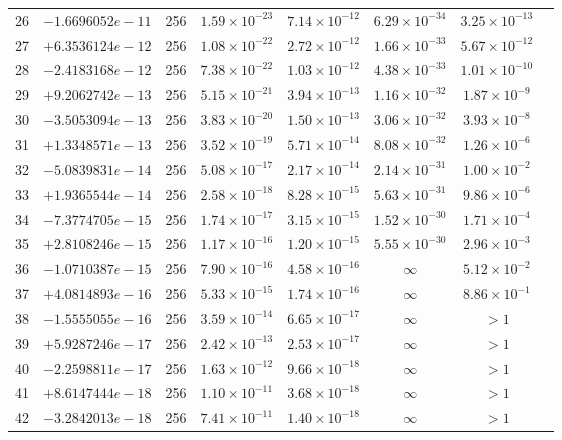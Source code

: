 \documentclass[11pt]{article}
\begin{document}
\begin{longtable}{rlcccccc}
26 & $-1.6696052e-11$ & 256 & $1.59 \times 10^{-23}$ & $7.14 \times 10^{-12}$ & $6.29 \times 10^{-34}$ & $3.25 \times 10^{-13}$ \\
27 & $+6.3536124e-12$ & 256 & $1.08 \times 10^{-22}$ & $2.72 \times 10^{-12}$ & $1.66 \times 10^{-33}$ & $5.67 \times 10^{-12}$ \\
28 & $-2.4183168e-12$ & 256 & $7.38 \times 10^{-22}$ & $1.03 \times 10^{-12}$ & $4.38 \times 10^{-33}$ & $1.01 \times 10^{-10}$ \\
29 & $+9.2062742e-13$ & 256 & $5.15 \times 10^{-21}$ & $3.94 \times 10^{-13}$ & $1.16 \times 10^{-32}$ & $1.87 \times 10^{-9}$ \\
30 & $-3.5053094e-13$ & 256 & $3.83 \times 10^{-20}$ & $1.50 \times 10^{-13}$ & $3.06 \times 10^{-32}$ & $3.93 \times 10^{-8}$ \\
31 & $+1.3348571e-13$ & 256 & $3.52 \times 10^{-19}$ & $5.71 \times 10^{-14}$ & $8.08 \times 10^{-32}$ & $1.26 \times 10^{-6}$ \\
32 & $-5.0839831e-14$ & 256 & $5.08 \times 10^{-17}$ & $2.17 \times 10^{-14}$ & $2.14 \times 10^{-31}$ & $1.00 \times 10^{-2}$ \\
33 & $+1.9365544e-14$ & 256 & $2.58 \times 10^{-18}$ & $8.28 \times 10^{-15}$ & $5.63 \times 10^{-31}$ & $9.86 \times 10^{-6}$ \\
34 & $-7.3774705e-15$ & 256 & $1.74 \times 10^{-17}$ & $3.15 \times 10^{-15}$ & $1.52 \times 10^{-30}$ & $1.71 \times 10^{-4}$ \\
35 & $+2.8108246e-15$ & 256 & $1.17 \times 10^{-16}$ & $1.20 \times 10^{-15}$ & $5.55 \times 10^{-30}$ & $2.96 \times 10^{-3}$ \\
\midrule
36 & $-1.0710387e-15$ & 256 & $7.90 \times 10^{-16}$ & $4.58 \times 10^{-16}$ & $\infty$ & $5.12 \times 10^{-2}$ \\
37 & $+4.0814893e-16$ & 256 & $5.33 \times 10^{-15}$ & $1.74 \times 10^{-16}$ & $\infty$ & $8.86 \times 10^{-1}$ \\
38 & $-1.5555055e-16$ & 256 & $3.59 \times 10^{-14}$ & $6.65 \times 10^{-17}$ & $\infty$ & $> 1$ \\
39 & $+5.9287246e-17$ & 256 & $2.42 \times 10^{-13}$ & $2.53 \times 10^{-17}$ & $\infty$ & $> 1$ \\
40 & $-2.2598811e-17$ & 256 & $1.63 \times 10^{-12}$ & $9.66 \times 10^{-18}$ & $\infty$ & $> 1$ \\
41 & $+8.6147444e-18$ & 256 & $1.10 \times 10^{-11}$ & $3.68 \times 10^{-18}$ & $\infty$ & $> 1$ \\
42 & $-3.2842013e-18$ & 256 & $7.41 \times 10^{-11}$ & $1.40 \times 10^{-18}$ & $\infty$ & $> 1$ \\

\end{longtable}
\end{document}
